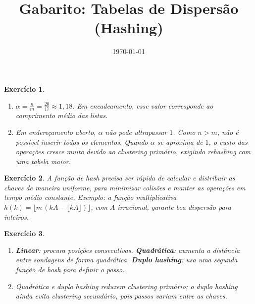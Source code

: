 \documentclass[12pt,oneside]{article}
\title{Gabarito: Tabelas de Dispersão (Hashing)}
\author{}
\date{\today}
\newtheorem{exercicio}{Exercício}
\begin{document}
\maketitle

\begin{exercicio}
\begin{enumerate}[label=\alph*)]
  \item $\displaystyle \alpha=\tfrac{n}{m}=\tfrac{20}{17}\approx 1{,}18.$  
  Em encadeamento, esse valor corresponde ao comprimento médio das listas.
  \item Em endereçamento aberto, $\alpha$ não pode ultrapassar $1$. Como $n>m$, não é possível inserir todos os elementos. Quando $\alpha$ se aproxima de $1$, o custo das operações cresce muito devido ao \emph{clustering primário}, exigindo rehashing com uma tabela maior.
\end{enumerate}
\end{exercicio}

\begin{exercicio}
A função de hash precisa ser rápida de calcular e distribuir as chaves de maneira uniforme, para minimizar colisões e manter as operações em tempo médio constante.  
Exemplo: a função multiplicativa $h(k)=\lfloor m\,(kA-\lfloor kA\rfloor)\rfloor$, com $A$ irracional, garante boa dispersão para inteiros.
\end{exercicio}

\begin{exercicio}
\begin{enumerate}[label=\alph*)]
  \item \textbf{Linear}: procura posições consecutivas.  
  \textbf{Quadrática}: aumenta a distância entre sondagens de forma quadrática.  
  \textbf{Duplo hashing}: usa uma segunda função de hash para definir o passo.
  \item Quadrática e duplo hashing reduzem \emph{clustering primário}; o duplo hashing ainda evita \emph{clustering secundário}, pois passos variam entre as chaves.
\end{enumerate}
\end{exercicio}
\end{document}
